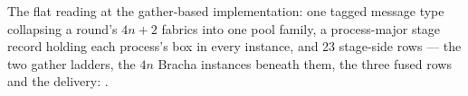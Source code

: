 \begin{definition}
  \label{def:aba-protocolg}
  \leanok
  The flat reading at the gather-based implementation: one tagged message type collapsing a round's $4n+2$ fabrics into one pool family, a process-major stage record holding each process's box in every instance, and 23 stage-side rows --- the two gather ladders, the $4n$ Bracha instances beneath them, the three fused rows and the delivery: .
\end{definition}
